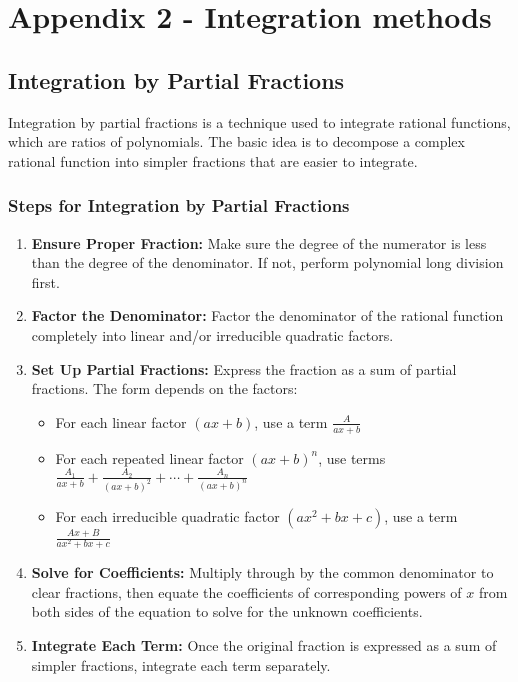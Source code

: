 \chapter{Appendix 2 - Integration methods}

\section*{Integration by Partial Fractions}

Integration by partial fractions is a technique used to integrate rational functions, which are ratios of polynomials. The basic idea is to decompose a complex rational function into simpler fractions that are easier to integrate.

\subsection*{Steps for Integration by Partial Fractions}

\begin{enumerate}
    \item \textbf{Ensure Proper Fraction:} Make sure the degree of the numerator is less than the degree of the denominator. If not, perform polynomial long division first.
    
    \item \textbf{Factor the Denominator:} Factor the denominator of the rational function completely into linear and/or irreducible quadratic factors.
    
    \item \textbf{Set Up Partial Fractions:} Express the fraction as a sum of partial fractions. The form depends on the factors:
    \begin{itemize}
        \item For each linear factor $(ax + b)$, use a term $\frac{A}{ax+b}$
        
        \item For each repeated linear factor $(ax + b)^n$, use terms 
        $\frac{A_1}{ax+b} + \frac{A_2}{(ax+b)^2} + \cdots + \frac{A_n}{(ax+b)^n}$
        
        \item For each irreducible quadratic factor $(ax^2 + bx + c)$, use a term $\frac{Ax+B}{ax^2+bx+c}$
    \end{itemize}
    
    \item \textbf{Solve for Coefficients:} Multiply through by the common denominator to clear fractions, then equate the coefficients of corresponding powers of $x$ from both sides of the equation to solve for the unknown coefficients.
    
    \item \textbf{Integrate Each Term:} Once the original fraction is expressed as a sum of simpler fractions, integrate each term separately.
\end{enumerate}